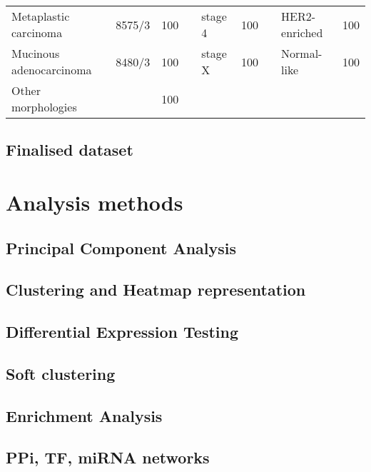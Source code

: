\begin{table}[!htbp]
{\begin{tabular}{lccclcclc}
\multicolumn{1}{|l|}{Metaplastic carcinoma} & \multicolumn{1}{c|}{8575/3} & \multicolumn{1}{c|}{\cellcolor[HTML]{BBDAFF}100} & \multicolumn{1}{c|}{} & \multicolumn{1}{l|}{stage 4} & \multicolumn{1}{c|}{\cellcolor[HTML]{FFCCC9}100} & \multicolumn{1}{c|}{} & \multicolumn{1}{l|}{HER2-enriched} & \multicolumn{1}{c|}{\cellcolor[HTML]{FFFFC7}100} \\ \cline{1-3} \cline{5-6} \cline{8-9} 
\multicolumn{1}{|l|}{Mucinous adenocarcinoma} & \multicolumn{1}{c|}{8480/3} & \multicolumn{1}{c|}{\cellcolor[HTML]{BBDAFF}100} & \multicolumn{1}{c|}{} & \multicolumn{1}{l|}{stage X} & \multicolumn{1}{c|}{\cellcolor[HTML]{FFCCC9}100} & \multicolumn{1}{c|}{} & \multicolumn{1}{l|}{Normal-like} & \multicolumn{1}{c|}{\cellcolor[HTML]{FFFFC7}100} \\ \cline{1-3} \cline{5-6} \cline{8-9} 
\multicolumn{1}{|l|}{Other morphologies} & \multicolumn{1}{l|}{} & \multicolumn{1}{c|}{\cellcolor[HTML]{BBDAFF}100} &  & \multicolumn{1}{c}{} &  &  & \multicolumn{1}{c}{} &  \\ \cline{1-3}
\end{tabular}%
}
\end{table}

    
    \subsection{Finalised dataset}
    
    
\section{Analysis methods}

    \subsection{Principal Component Analysis}
    

    \subsection{Clustering and Heatmap representation}

    \subsection{Differential Expression Testing}

    \subsection{Soft clustering}
    
    \subsection{Enrichment Analysis}
    
    \subsection{PPi, TF, miRNA networks}